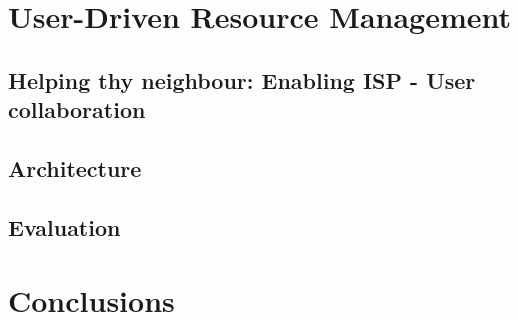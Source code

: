 \section{User-Driven Resource Management} \label{s:qos}
\subsection{Helping thy neighbour: Enabling ISP - User
  collaboration}
\subsection{Architecture} 
\subsection{Evaluation}

\section{Conclusions}

